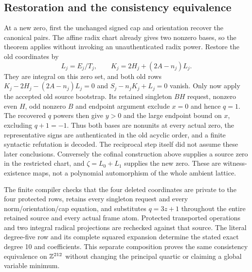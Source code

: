\subsection{Restoration and the consistency equivalence}
At a new zero, first the unchanged signed cap and orientation recover the
canonical pairs. The affine radix chart already gives two nonzero bases,
so the theorem applies without invoking an unauthenticated radix power.
Restore the old coordinates by
\[
 L_j=E_j/T_j,\qquad K_j=2H_j+(2A-n_j)L_j.
\]
They are integral on this zero set, and both old rows
$K_j-2H_j-(2A-n_j)L_j=0$ and $S_j-n_jK_j+L_j=0$ vanish.
Only now apply the accepted old source bootstrap. Its retained singleton
$BH$ request, nonzero even $H$, odd nonzero $B$ and endpoint argument
exclude $x=0$ and hence $q=1$. The recovered $q$ powers then give
$y>0$ and the large endpoint bound on $x$, excluding $q+1=-1$. Thus
both bases are nonunits at every actual zero, the representative signs
are authenticated in the old acyclic order, and a finite syntactic
refutation is decoded. The reciprocal step itself did not assume these
later conclusions.
Conversely the cofinal construction above supplies a source zero in the
restricted chart, and $\zeta=L_0+L_1$ supplies the new zero.
These are witness-existence maps, not a polynomial automorphism of the
whole ambient lattice.

The finite compiler checks that the four deleted coordinates are private
to the four protected rows, retains every singleton request and every
norm/orientation/cap equation, and substitutes $q=3z+1$ throughout the
entire retained source and every actual frame atom. Protected transported
operations and two integral radical projections are rechecked against
that source. The literal degree-five row and its complete squared
expansion determine the stated exact degree 10 and coefficients. This
separate composition proves the same consistency equivalence on
$\mathbb Z^{212}$ without changing the principal quartic or claiming a global
variable minimum.
